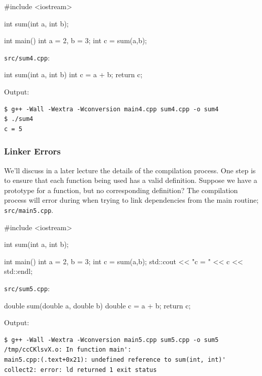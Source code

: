 \documentclass[12pt,letterpaper,twoside]{article}
\begin{document}
\begin{cpp}
#include <iostream>

int sum(int a, int b);

int main() {
  int a = 2, b = 3;
  int c = sum(a,b);
}
\end{cpp}

\texttt{src/sum4.cpp}:

\begin{cpp}
int sum(int a, int b) {
  int c = a + b;
  return c;
}
\end{cpp}

Output:
{\small
\begin{verbatim}
$ g++ -Wall -Wextra -Wconversion main4.cpp sum4.cpp -o sum4
$ ./sum4
c = 5
\end{verbatim}
}
\subsubsection{Linker Errors} We'll discuss in a later lecture the details of the 
compilation process. One step is to ensure that each function being used has a valid 
definition. Suppose we have a prototype for a function, but no corresponding definition?
The compilation process will error during when trying to link dependencies from the main
routine; \texttt{src/main5.cpp}.

\begin{cpp}
#include <iostream>

int sum(int a, int b);

int main() {
  int a = 2, b = 3;
  int c = sum(a,b);
  std::cout << "c = " << c << std::endl;
}
\end{cpp}

\texttt{src/sum5.cpp}:

\begin{cpp}
double sum(double a, double b) {
  double c = a + b;
  return c;
}
\end{cpp}

Output:

{\small
\begin{verbatim}
$ g++ -Wall -Wextra -Wconversion main5.cpp sum5.cpp -o sum5
/tmp/ccCKlsvX.o: In function main':
main5.cpp:(.text+0x21): undefined reference to sum(int, int)'
collect2: error: ld returned 1 exit status
\end{verbatim}
}
\end{document}
